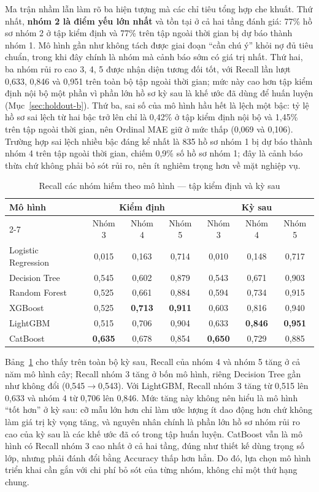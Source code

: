 Ma trận nhầm lẫn làm rõ ba hiện tượng mà các chỉ tiêu tổng hợp che khuất. Thứ nhất, \textbf{nhóm 2 là điểm yếu lớn nhất} và tồn tại ở cả hai tầng đánh giá: 77\% hồ sơ nhóm 2 ở tập kiểm định và 77\% trên tập ngoài thời gian bị dự báo thành nhóm 1. Mô hình gần như không tách được giai đoạn ``cần chú ý'' khỏi nợ đủ tiêu chuẩn, trong khi đây chính là nhóm mà cảnh báo sớm có giá trị nhất. Thứ hai, ba nhóm rủi ro cao 3, 4, 5 được nhận diện tương đối tốt, với Recall lần lượt 0,633, 0,846 và 0,951 trên toàn bộ tập ngoài thời gian; mức này cao hơn tập kiểm định nội bộ một phần vì phần lớn hồ sơ kỳ sau là khế ước đã dùng để huấn luyện (Mục~\ref{sec:holdout-b}). Thứ ba, sai số của mô hình hầu hết là lệch một bậc: tỷ lệ hồ sơ sai lệch từ hai bậc trở lên chỉ là 0,42\% ở tập kiểm định nội bộ và 1,45\% trên tập ngoài thời gian, nên Ordinal MAE giữ ở mức thấp (0,069 và 0,106). Trường hợp sai lệch nhiều bậc đáng kể nhất là 835 hồ sơ nhóm 1 bị dự báo thành nhóm 4 trên tập ngoài thời gian, chiếm 0,9\% số hồ sơ nhóm 1; đây là cảnh báo thừa chứ không phải bỏ sót rủi ro, nên ít nghiêm trọng hơn về mặt nghiệp vụ.

\begin{table}[H]
\centering
\caption{Recall các nhóm hiếm theo mô hình --- tập kiểm định và kỳ sau}
\label{tab:recall-by-model}
\begin{tabular}{|l|c|c|c||c|c|c|}
\hline
\multirow{2}{*}{Mô hình} & \multicolumn{3}{c||}{Kiểm định} & \multicolumn{3}{c|}{Kỳ sau}\\
\cline{2-7}
 & Nhóm 3 & Nhóm 4 & Nhóm 5 & Nhóm 3 & Nhóm 4 & Nhóm 5\\
\hline
Logistic Regression & 0,015 & 0,163 & 0,714 & 0,010 & 0,148 & 0,717\\
Decision Tree & 0,545 & 0,602 & 0,879 & 0,543 & 0,671 & 0,903\\
Random Forest & 0,525 & 0,661 & 0,884 & 0,594 & 0,734 & 0,915\\
XGBoost & 0,525 & \textbf{0,713} & \textbf{0,911} & 0,603 & 0,816 & 0,940\\
LightGBM & 0,515 & 0,706 & 0,904 & 0,633 & \textbf{0,846} & \textbf{0,951}\\
CatBoost & \textbf{0,635} & 0,678 & 0,854 & \textbf{0,650} & 0,729 & 0,885\\
\hline
\end{tabular}
\end{table}

Bảng~\ref{tab:recall-by-model} cho thấy trên toàn bộ kỳ sau, Recall của nhóm 4 và nhóm 5 tăng ở cả năm mô hình cây; Recall nhóm 3 tăng ở bốn mô hình, riêng Decision Tree gần như không đổi (0,545$\to$0,543). Với LightGBM, Recall nhóm 3 tăng từ 0,515 lên 0,633 và nhóm 4 từ 0,706 lên 0,846. Mức tăng này không nên hiểu là mô hình ``tốt hơn'' ở kỳ sau: cỡ mẫu lớn hơn chỉ làm ước lượng ít dao động hơn chứ không làm giá trị kỳ vọng tăng, và nguyên nhân chính là phần lớn hồ sơ nhóm rủi ro cao của kỳ sau là các khế ước đã có trong tập huấn luyện. CatBoost vẫn là mô hình có Recall nhóm 3 cao nhất ở cả hai tầng, đúng như thiết kế dùng trọng số lớp, nhưng phải đánh đổi bằng Accuracy thấp hơn hẳn. Do đó, lựa chọn mô hình triển khai cần gắn với chi phí bỏ sót của từng nhóm, không chỉ một thứ hạng chung.

